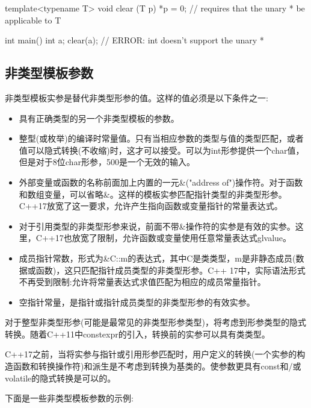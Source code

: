 \begin{cpp}
template<typename T>
void clear (T p)
{
	*p = 0; // requires that the unary * be applicable to T
}

int main()
{
	int a;
	clear(a); // ERROR: int doesn't support the unary *
}
\end{cpp}

\subsection{非类型模板参数}

非类型模板实参是替代非类型形参的值。这样的值必须是以下条件之一:

\begin{itemize}
\item 
具有正确类型的另一个非类型模板的参数。

\item
整型(或枚举)的编译时常量值。只有当相应参数的类型与值的类型匹配，或者值可以隐式转换(不收缩)时，这才可以接受。可以为int形参提供一个char值，但是对于8位char形参，500是一个无效的输入。

\item 
外部变量或函数的名称前面加上内置的一元\&("address of")操作符。对于函数和数组变量，可以省略\&。这样的模板实参匹配指针类型的非类型形参。C++17放宽了这一要求，允许产生指向函数或变量指针的常量表达式。

\item 
对于引用类型的非类型形参来说，前面不带\&操作符的实参是有效的实参。这里，C++17也放宽了限制，允许函数或变量使用任意常量表达式glvalue。

\item 
成员指针常数，形式为\&C::m的表达式，其中C是类类型，m是非静态成员(数据或函数)，这只匹配指针成员类型的非类型形参。C++ 17中，实际语法形式不再受到限制:允许将常量表达式求值匹配为相应的成员常量指针。

\item 
空指针常量，是指针或指针成员类型的非类型形参的有效实参。
\end{itemize}

对于整型非类型形参(可能是最常见的非类型形参类型)，将考虑到形参类型的隐式转换。随着C++11中constexpr的引入，转换前的实参可以具有类类型。

C++17之前，当将实参与指针或引用形参匹配时，用户定义的转换(一个实参的构造函数和转换操作符)和派生是不考虑到转换为基类的。使参数更具有const和/或volatile的隐式转换是可以的。

下面是一些非类型模板参数的示例:

